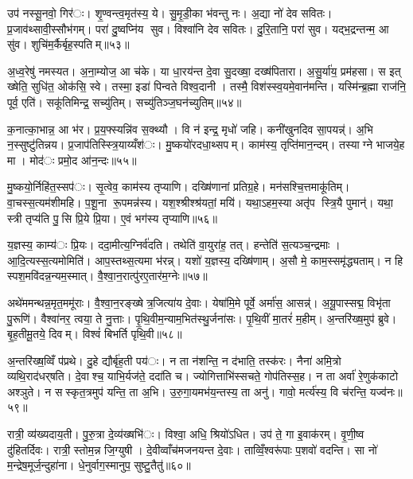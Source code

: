 उप॑ नस्सू॒नवो॒ गिर॑ः। शृ॒ण्वन्त्व॒मृत॑स्य॒ ये। सु॒मृ॒डी॒का भ॑वन्तु नः। अ॒द्या नो॑ देव सवितः। प्र॒जाव॑थ्सावी॒स्सौभ॑गम्। परा॑ दु॒ष्वप्नि॑य सुव। विश्वा॑नि देव सवितः। दु॒रि॒तानि॒ परा॑ सुव। यद्भ॒द्रन्तन्म॒ आ सु॑व। शुचि॑म॒र्कैर्बृह॒स्पतिम्॥५३॥

अ॒ध्व॒रेषु॑ नमस्यत। अ॒ना॒म्योज॒ आ च॑के। या धा॒रय॑न्त दे॒वा सु॒दख्षा॒ दख्ष॑पितारा। अ॒सु॒र्या॑य॒ प्रम॑हसा। स इत् ख्षेति॒ सुधि॑त॒ ओक॑सि॒ स्वे। तस्मा॒ इडा॑ पिन्वते विश्व॒दानी। तस्मै॒ विश॑स्स्व॒यमे॒वान॑मन्ति। यस्मि॑न्ब्र॒ह्मा राज॑नि॒ पूर्व॒ एति॑। सकू॑तिमिन्द्र॒ सच्यु॑तिम्। सच्यु॑तिञ्ज॒घन॑च्युतिम्॥५४॥

क॒नात्का॒भान्न॒ आ भ॑र। प्र॒य॒फ्स्यन्नि॑व स॒क्थ्यौ। वि न॑ इन्द्र॒ मृधो॑ जहि। कनी॑खुनदिव सा॒पयन्न्॑। अ॒भि न॒स्सुष्टु॑तिन्नय। प्र॒जाप॑तिस्स्त्रि॒याय्यँश॑ः। मु॒ष्कयो॑रदधा॒थ्सपम्। काम॑स्य॒ तृप्ति॑मान॒न्दम्। तस्याग्ने भाजये॒ह मा। मोद॑ः प्रमो॒द आ॑न॒न्दः॥५५॥

मु॒ष्कयो॒र्निहि॑त॒स्सप॑ः। सृ॒त्वेव॒ काम॑स्य तृप्याणि। दख्षि॑णानां प्रतिग्र॒हे। मन॑सश्चि॒त्तमाकू॑तिम्। वा॒चस्स॒त्यम॑शीमहि। प॒शू॒ना रू॒पमन्न॑स्य। यश॒श्श्रीश्श्र॑यतां॒ मयि॑। यथा॒ऽहम॒स्या अतृ॑प स्त्रि॒यै पुमान्॑। यथा॒ स्त्री तृप्य॑ति पु॒सि प्रि॒ये प्रि॒या। ए॒वं भग॑स्य तृप्याणि॥५६॥

य॒ज्ञस्य॒ काम्य॑ः प्रि॒यः। ददा॒मीत्य॒ग्निर्व॑दति। तथेति॑ वा॒युरा॑ह॒ तत्। हन्तेति॑ स॒त्यञ्च॒न्द्रमाः। आ॒दि॒त्यस्स॒त्यमोमिति॑। आप॒स्तथ्स॒त्यमा भ॑रन्न्। यशो॑ य॒ज्ञस्य॒ दख्षि॑णाम्। अ॒सौ मे॒ काम॒स्समृ॑द्ध्यताम्। न हि स्पश॒मवि॑दन्न॒न्यम॒स्मात्। वै॒श्वा॒न॒रात्पु॑रए॒तार॑म॒ग्नेः॥५७॥

अथे॑ममन्थन्न॒मृत॒ममू॑राः। वै॒श्वा॒न॒रङ्ख्षेत्र॒जित्या॑य दे॒वाः। येषा॑मि॒मे पूर्वे॒ अर्मा॑स॒ आसन्न्॑। अ॒यू॒पास्सद्म॒ विभृ॑ता पु॒रूणि॑। वैश्वा॑नर॒ त्वया॒ ते नु॒त्ताः। पृ॒थि॒वीम॒न्याम॒भित॑स्थु॒र्जना॑सः। पृ॒थि॒वीं मा॒तरं॑ म॒हीम्। अ॒न्तरि॑ख्ष॒मुप॑ ब्रुवे। बृ॒ह॒तीमू॒तये॒ दिवम्। विश्वं॑ बिभर्ति पृथि॒वी॥५८॥

अ॒न्तरि॑ख्ष॒व्विँ प॑प्रथे। दु॒हे द्यौर्बृ॑ह॒ती पय॑ः। न ता न॑शन्ति॒ न द॑भाति॒ तस्क॑रः। नैना॑ अमि॒त्रो व्यथि॒राद॑धर्‌षति। दे॒वाश्च॒ याभि॒र्यज॑ते॒ ददा॑ति च। ज्योगित्ताभि॑स्सचते॒ गोप॑तिस्स॒ह। न ता अर्वा॑ रे॒णुक॑काटो अश्ञुते। न सस्कृत॒त्रमुप॑ यन्ति॒ ता अ॒भि। उ॒रु॒गा॒यमभ॑य॒न्तस्य॒ ता अनु॑। गावो॒ मर्त्य॑स्य॒ वि च॑रन्ति॒ यज्व॑नः॥५९॥

रात्री॒ व्य॑ख्यदाय॒ती। पु॒रु॒त्रा दे॒व्य॑ख्षभि॑ः। विश्वा॒ अधि॒ श्रियो॑ऽधित। उप॑ ते॒ गा इ॒वाक॑रम्। वृ॒णी॒ष्व दु॑हितर्दिवः। रात्री॒ स्तोम॒न्न जि॒ग्युषी। दे॒वीव्वाँच॑मजनयन्त दे॒वाः। ताव्विँ॒श्वरू॑पाः प॒शवो॑ वदन्ति। सा नो॑ म॒न्द्रेष॒मूर्ज॒न्दुहा॑ना। धे॒नुर्वाग॒स्मानुप॒ सुष्टु॒तैतु॑॥६०॥

